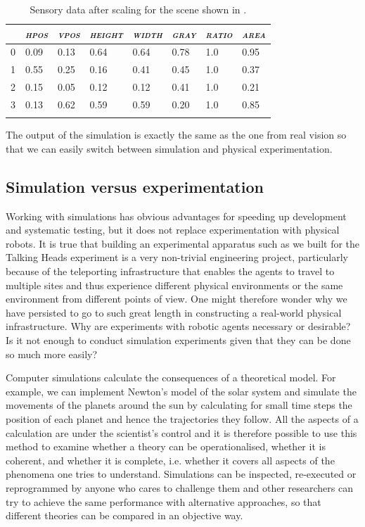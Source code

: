 \begin{table}
\begin{center}
\begin{tabular}{  l   l   l   l   l   l   l   l  }
\lsptoprule
& {\itshape \textsc{hpos}} & {\itshape \textsc{vpos}} & {\itshape \textsc{height}} & {\itshape \textsc{width}} & {\itshape \textsc{gray}} & {\itshape \textsc{ratio}}  & {\itshape \textsc{area}} \\ \midrule
0 & 0.09 & 0.13 &  0.64 &  0.64 &  0.78 &  1.0 & 0.95 \\ 
1 & 0.55 & 0.25 & 0.16 & 0.41 & 0.45 & 1.0 & 0.37 \\ 
2 & 0.15 & 0.05 & 0.12 & 0.12 & 0.41 & 1.0 & 0.21 \\ 
3 & 0.13 & 0.62 & 0.59 & 0.59 & 0.20 & 1.0 & 0.85 \\ 
\lspbottomrule
\end{tabular}
\end{center}
\caption{\label{tab:t-geomscaled}Sensory data after scaling for the scene shown in .}
\end{table}

The output of the simulation is exactly the same as the one from real vision 
so that we can easily switch between simulation 
and physical experimentation. 

\subsection{Simulation versus experimentation}

Working with simulations has obvious advantages for 
speeding up development and systematic testing, 
but it does not replace experimentation with 
physical robots. It is true that 
building an experimental apparatus such as we built
for the Talking Heads experiment is a very 
non-trivial engineering project, particularly because 
of the teleporting infrastructure that enables the agents 
to travel to multiple sites and thus 
experience different physical environments or the same 
environment from different points of view. 
One might therefore wonder why we have persisted
to go to such great length in constructing
a real-world physical infrastructure. Why are
experiments with robotic agents necessary or 
desirable? Is it not enough to conduct simulation
experiments given that they can be done so much 
more easily? 

Computer simulations calculate the consequences of a
theoretical model. For example, we can implement Newton's
model of the solar system and simulate the movements
of the planets around the sun by calculating for 
small time steps the position of each planet and hence
the trajectories they follow. All the aspects of 
a calculation are under the scientist's control and it 
is therefore possible to use this method to examine whether a theory can 
be operationalised, whether it is coherent, and whether 
it is complete, i.e. whether it covers all 
aspects of the phenomena one tries to understand. 
Simulations can be inspected, re-executed
or reprogrammed by anyone who cares to challenge them and
other researchers can try to achieve the
same performance with alternative approaches, so that 
different theories can be compared in an objective way. 

